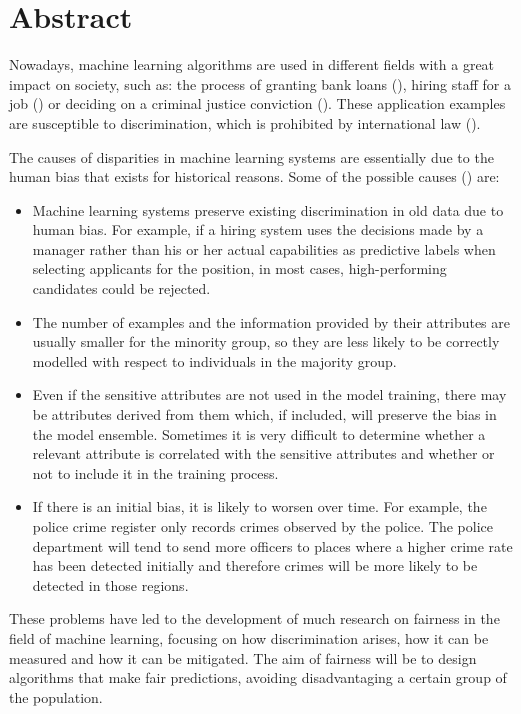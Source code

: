 \chapter*{Abstract}

Nowadays, machine learning algorithms are used in different fields with a great impact on society, such as: the process of granting bank loans (\cite{prestamo2018}), hiring staff for a job (\cite{contratar2015}) or deciding on a criminal justice conviction (\cite{condena2016}). These application examples are susceptible to discrimination, which is prohibited by international law (\cite{ley1964}).

The causes of disparities in machine learning systems are essentially due to the human bias that exists for historical reasons. Some of the possible causes (\cite{bigdata2016}) are:

\begin{itemize}
    \item Machine learning systems preserve existing discrimination in old data due to human bias. For example, if a hiring system uses the decisions made by a manager rather than his or her actual capabilities as predictive labels when selecting applicants for the position, in most cases, high-performing candidates could be rejected.
    \item The number of examples and the information provided by their attributes are usually smaller for the minority group, so they are less likely to be correctly modelled with respect to individuals in the majority group.
    \item Even if the sensitive attributes are not used in the model training, there may be attributes derived from them which, if included, will preserve the bias in the model ensemble. Sometimes it is very difficult to determine whether a relevant attribute is correlated with the sensitive attributes and whether or not to include it in the training process.
    \item If there is an initial bias, it is likely to worsen over time. For example, the police crime register only records crimes observed by the police. The police department will tend to send more officers to places where a higher crime rate has been detected initially and therefore crimes will be more likely to be detected in those regions. 
\end{itemize}

These problems have led to the development of much research on fairness in the field of machine learning, focusing on how discrimination arises, how it can be measured and how it can be mitigated. The aim of fairness will be to design algorithms that make fair predictions, avoiding disadvantaging a certain group of the population.

